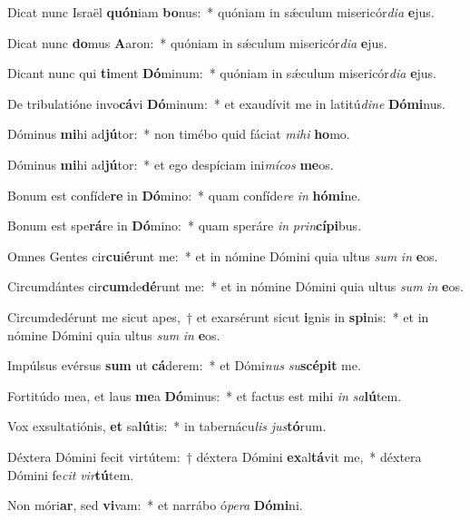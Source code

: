 \item Dicat nunc Israël \textbf{quón}iam \textbf{bo}nus:~* quóniam in sǽculum misericór\textit{di}\textit{a} \textbf{e}jus.
\item Dicat nunc \textbf{do}mus \textbf{A}aron:~* quóniam in sǽculum misericór\textit{di}\textit{a} \textbf{e}jus.
\item Dicant nunc qui \textbf{ti}ment \textbf{Dó}minum:~* quóniam in sǽculum misericór\textit{di}\textit{a} \textbf{e}jus.
\item De tribulatióne invo\textbf{cá}vi \textbf{Dó}minum:~* et exaudívit me in latitú\textit{di}\textit{ne} \textbf{Dó}\textbf{mi}nus.
\item Dóminus \textbf{mi}hi ad\textbf{jú}tor:~* non timébo quid fáciat \textit{mi}\textit{hi} \textbf{ho}mo.
\item Dóminus \textbf{mi}hi ad\textbf{jú}tor:~* et ego despíciam ini\textit{mí}\textit{cos} \textbf{me}os.
\item Bonum est confíde\textbf{re} in \textbf{Dó}mino:~* quam confíde\textit{re} \textit{in} \textbf{hó}\textbf{mi}ne.
\item Bonum est spe\textbf{rá}re in \textbf{Dó}mino:~* quam speráre \textit{in} \textit{prin}\textbf{cí}\textbf{pi}bus.
\item Omnes Gentes cir\textbf{cu}i\textbf{é}runt me:~* et in nómine Dómini quia ultus \textit{sum} \textit{in} \textbf{e}os.
\item Circumdántes cir\textbf{cum}de\textbf{dé}runt me:~* et in nómine Dómini quia ultus \textit{sum} \textit{in} \textbf{e}os.
\item Circumdedérunt me sicut apes,~† et exarsérunt sicut \textbf{i}gnis in \textbf{spi}nis:~* et in nómine Dómini quia ultus \textit{sum} \textit{in} \textbf{e}os.
\item Impúlsus evérsus \textbf{sum} ut \textbf{cá}derem:~* et Dómi\textit{nus} \textit{su}\textbf{scé}\textbf{pit} me.
\item Fortitúdo mea, et laus \textbf{me}a \textbf{Dó}minus:~* et factus est mihi \textit{in} \textit{sa}\textbf{lú}tem.
\item Vox exsultatiónis, \textbf{et} sa\textbf{lú}tis:~* in tabernácu\textit{lis} \textit{jus}\textbf{tó}rum.
\item Déxtera Dómini fecit virtútem:~† déxtera Dómini \textbf{ex}al\textbf{tá}vit me,~* déxtera Dómini fe\textit{cit} \textit{vir}\textbf{tú}tem.
\item Non móri\textbf{ar}, sed \textbf{vi}vam:~* et narrábo ó\textit{pe}\textit{ra} \textbf{Dó}\textbf{mi}ni.
